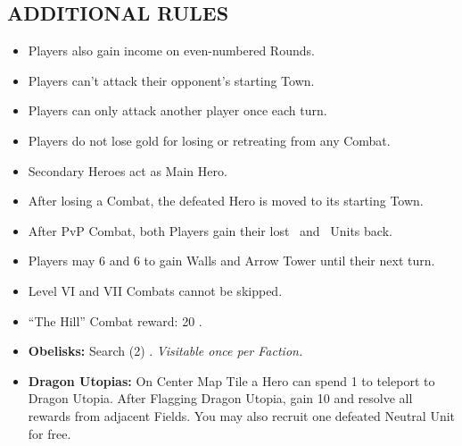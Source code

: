 \begin{multicols}{2}
\subsection*{\MakeUppercase{Additional Rules}}
\begin{itemize}
  \item Players also gain income on even-numbered Rounds.
  \item Players can't attack their opponent's starting Town.
  \item Players can only attack another player once each turn.
  \item Players do not lose gold for losing or retreating from any Combat.
  \item Secondary Heroes act as Main Hero.
  \item After losing a Combat, the defeated Hero is moved to its starting Town.
  \item After PvP Combat, both Players gain their lost \bronze\ and \silver\ Units back.
  \item Players may  6  and 6  to gain Walls and Arrow Tower until their next turn.
  \item Level VI and VII Combats cannot be skipped.
  \item ``The Hill'' Combat reward: 20 .
  \item \textbf{Obelisks:} Search (2) . \textit{Visitable once per Faction.}
  \item \textbf{Dragon Utopias:} On Center Map Tile a Hero can spend 1  to teleport to Dragon Utopia. After Flagging Dragon Utopia, gain 10  and resolve all rewards from adjacent Fields. You may also recruit one defeated Neutral Unit for free.
\end{itemize}

\columnbreak

\end{multicols}

